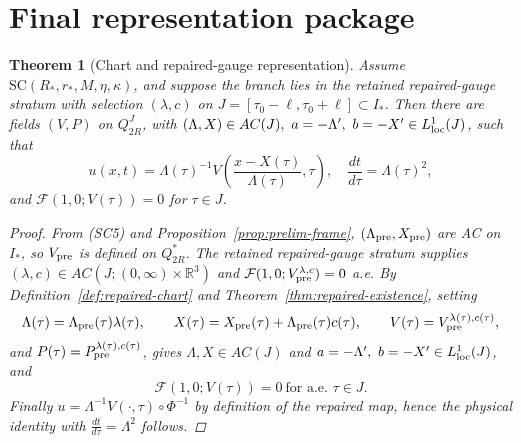 \documentclass[11pt]{amsart}
\theoremstyle{plain}
\newtheorem{theorem}{Theorem}[section]
\theoremstyle{definition}
\theoremstyle{remark}
\begin{document}
\section{Final representation package}\label{sec:final}

\begin{theorem}[Chart and repaired-gauge representation]\label{thm:A}
Assume \(\mathrm{SC}(R_*,r_*,M,\eta,\kappa)\), and suppose the branch lies in the
retained repaired-gauge stratum with selection \((\lambda,c)\) on
\(J=[\tau_0-\ell,\tau_0+\ell]\subset I_*\). Then there are fields \((V,P)\) on \(Q_{2R}^J\), with
\((\Lambda,X)\in AC(J),\ a=-\Lambda',\ b=-X'\in L^1_{\rm loc}(J)\), such that
\[
u(x,t)=\Lambda(\tau)^{-1}V\!\left(\frac{x-X(\tau)}{\Lambda(\tau)},\tau\right),\quad
\frac{dt}{d\tau}=\Lambda(\tau)^2,
\]
and \(\mathcal F(1,0;V(\tau))=0\) for \(\tau\in J\).
\begin{proof}
From \textup{(SC5)} and Proposition~\ref{prop:prelim-frame}, \((\Lambda_{\rm pre},X_{\rm pre})\)
are AC on \(I_*\), so \(V_{\rm pre}\) is defined on \(Q_{2R}^*\).
The retained repaired-gauge stratum supplies
\((\lambda,c)\in AC(J;(0,\infty)\times\mathbb R^3)\) and
\(\mathcal F(1,0;V_{\rm pre}^{\lambda,c})=0\) a.e.
By Definition~\ref{def:repaired-chart} and Theorem~\ref{thm:repaired-existence}, setting
\[
\Lambda(\tau)=\Lambda_{\rm pre}(\tau)\lambda(\tau),\qquad
X(\tau)=X_{\rm pre}(\tau)+\Lambda_{\rm pre}(\tau)c(\tau),\qquad
V(\tau)=V_{\rm pre}^{\lambda(\tau),c(\tau)},
\]
and \(P(\tau)=P_{\rm pre}^{\lambda(\tau),c(\tau)}\),
gives \( \Lambda,X\in AC(J)\) and \(a=-\Lambda',\ b=-X'\in L^1_{\rm loc}(J)\), and
\[
\mathcal F(1,0;V(\tau))=0\ \text{for a.e. }\tau\in J.
\]
Finally \(u=\Lambda^{-1}V(\cdot,\tau)\circ\Phi^{-1}\) by definition of the repaired map, hence the
physical identity with \(\frac{dt}{d\tau}=\Lambda^2\) follows.
\end{proof}
\end{theorem}
\end{document}
